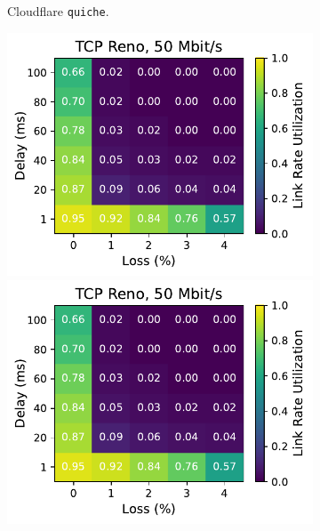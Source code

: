 \begin{figure}[ht]
\begin{subfigure}[b]{0.22\linewidth}
        \caption{Cloudflare \texttt{quiche}.}
    \end{subfigure}
    \begin{subfigure}[b]{1cm}
        \includegraphics[width=\linewidth,trim={8cm 0 0 0},clip]{figures/heatmaps/heatmap_tcp_reno_50mbps.pdf}
        \vspace*{0.22cm}
        \includegraphics[width=\linewidth,trim={8cm 0 0 0},clip]{figures/heatmaps/heatmap_tcp_reno_50mbps.pdf}
        \vspace*{0.22cm}

\end{subfigure}
\end{figure}
